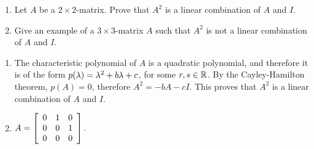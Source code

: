 \documentclass{ximera}
\begin{document}
\begin{exercise}
  \begin{enumerate}
  \item Let $A$ be a $2\times 2$-matrix. Prove that $A^2$ is a linear
    combination of $A$ and $I$.
  \item Give an example of a $3\times 3$-matrix $A$ such that $A^2$
    is not a linear combination of $A$ and $I$.
  \end{enumerate}
  \begin{solution}
    \begin{enumerate}
    \item The characteristic polynomial of $A$ is a quadratic
      polynomial, and therefore it is of the form
      $p(\eigenvar) = \eigenvar^2 + b\eigenvar + c$, for some
      $r,s\in\R$. By the Cayley-Hamilton theorem, $p(A)=0$, therefore
      $A^2 = -bA - cI$. This proves that $A^2$ is a linear combination
      of $A$ and $I$.
    \item $A=\startmat{rrr}
        0 & 1 & 0 \\
        0 & 0 & 1 \\
        0 & 0 & 0 \\
      \stopmat$.
    \end{enumerate}
  \end{solution}
\end{exercise}
\end{document}
